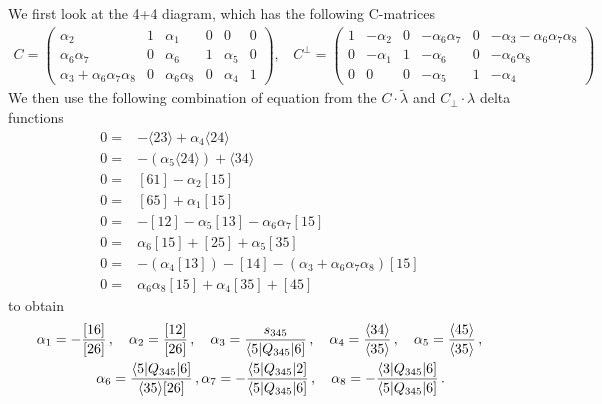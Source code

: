 \documentclass[letter,11pt]{article}
\newcommand{\ab}[1]{\langle #1 \rangle}
\newcommand{\sqb}[1]{[ #1 ]}
\newcommand{\aMs}[3]{\langle #1|#2|#3]}  		%
\newcommand{\sab}[1]{s_{#1}}
\newcommand{\twhite}[1]{\textcolor{white}{#1}}
\begin{document}
We first look at the 4+4 diagram, which has the following C-matrices
\begin{equation}
	\begin{aligned}
		C=\begin{pmatrix}
			\alpha_2 & 1 & \alpha_1 & 0 & 0 & 0\\
			\alpha_6 \alpha_7 & 0 &\alpha_6 & 1 & \alpha_5 & 0\\
			\alpha_3+\alpha_6\alpha_7\alpha_8 & 0 & \alpha_6\alpha_8  & 0 & \alpha_4 & 1
		\end{pmatrix},~~~~	C^\perp=\begin{pmatrix}
		1 & -\alpha_2 & 0 &-\alpha_6 \alpha_7 & 0 & -\alpha_3-\alpha_6\alpha_7\alpha_8\\
		0  & -\alpha_1 & 1 & -\alpha_6 & 0 & -\alpha_6\alpha_8\\
		0 & 0 & 0  & -\alpha_5 & 1 & -\alpha_4
	\end{pmatrix}
	\end{aligned}
\end{equation}
We then use the following combination of equation from the $C\cdot\tilde \lambda$ and $C_\perp\cdot \lambda$ delta functions
\begin{equation}
	\begin{aligned}
0=&-\langle 2 3 \rangle + \alpha_{4} \langle 2 4 \rangle
\\
0=&-(\alpha_{5} \langle 2 4 \rangle) + \langle 3 4 \rangle
\\
0=&\left[ 6 1 \right] - \alpha_{2} \left[ 1 5 \right]
\\
0=&\left[ 6 5 \right] + \alpha_{1} \left[ 1 5 \right]
\\
0=&-\left[ 1 2 \right] - \alpha_{5} \left[ 1 3 \right] - \alpha_{6} \alpha_{7} \left[ 1 5 \right]
\\
0=&\alpha_{6} \left[ 1 5 \right] + \left[ 2 5 \right] + \alpha_{5} \left[ 3 5 \right]
\\
0=&-(\alpha_{4} \left[ 1 3 \right]) - \left[ 1 4 \right] - ( \alpha_{3} + \alpha_{6} \alpha_{7} \alpha_{8}) \left[ 1 5 \right]
\\
0=&\alpha_{6} \alpha_{8} \left[ 1 5 \right] + \alpha_{4} \left[ 3 5 \right] + \left[ 4 5 \right]
	\end{aligned}
\end{equation}
to obtain
\begin{align*}
	& \alpha_1 = -\frac{[16]}{[26]}\,, \quad \alpha_2 = \frac{[12]}{[26]}\,, \quad \alpha_3 = \frac{\sab{345}}{\aMs{5}{Q_{345}}{6}}\,, \quad \alpha_4 = \frac{\ab{34}}{\ab{35}}\,, \quad
	\alpha_5 = \frac{\ab{45}}{\ab{35}}\,, \\ 
	& \twhite{.}\hspace{1.4cm} 
	\alpha_6 = \frac{\aMs{5}{Q_{345}}{6}}{\ab{35}\sqb{26}}\,, \alpha_7 = -\frac{\aMs{5}{Q_{345}}{2}}{\aMs{5}{Q_{345}}{6}}\,,\quad
	\alpha_8 = - \frac{\aMs{3}{Q_{345}}{6}}{\aMs{5}{Q_{345}}{6}}\,.
\end{align*}
\end{document}
